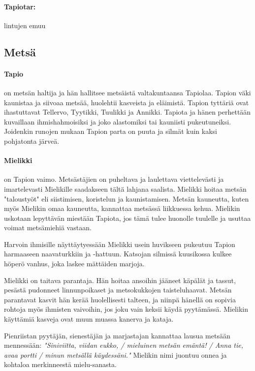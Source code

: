   \paragraph{Tapiotar:} lintujen emuu


\subsection{Metsä}

  \paragraph{Tapio} on metsän haltija ja hän hallitsee metsäistä valtakuntaansa Tapiolaa. Tapion
    väki kaunistaa ja siivoaa metsää, huolehtii kasveista ja eläimistä. Tapion tyttäriä ovat
    ihastuttavat Tellervo, Tyytikki, Tuulikki ja Annikki. Tapiota ja hänen perhettään kuvaillaan
    ihmishahmoisiksi ja joko alastomiksi tai kauniisti pukeutuneiksi. Joidenkin runojen mukaan
    Tapion parta on puuta ja silmät kuin kaksi pohjatonta järveä.
  \paragraph{Mielikki} on Tapion vaimo. Metsästäjien on puheltava ja laulettava viettelevästi ja
    imartelevasti Mielikille saadakseen tältä lahjana saalista. Mielikki hoitaa metsän "taloustyöt"
    eli siistimisen, koristelun ja kaunistamisen. Metsän kauneutta, kuten myös Mielikin omaa
    kauneutta, kannattaa metsässä liikkuessa kehua. Mielikin uskotaan lepyttävän miestään Tapiota,
    jos tämä tulee huonolle tuulelle ja usuttaa voimat metsämiehiä vastaan. \par
    Harvoin ihmisille näyttäytyessään Mielikki usein huvikseen pukeutuu Tapion harmaaseen
    naavaturkkiin ja -hattuun. Katsojan silmissä kuu\-sikossa kulkee höperö vanhus, joka laskee
    mättäiden marjoja. \par
    Mielikki on taitava parantaja. Hän hoitaa ansoihin jääneet käpälät ja tassut, pesästä pudonneet
    linnunpoikaset ja metsokukkojen taisteluhaavat. Metsän parantavat kasvit hän kerää
    huolellisesti talteen, ja niinpä hänellä on sopivia rohtoja myös ihmisten vaivoihin, jos joku
    vain keksii käydä pyytämässä. Mielikin käyttämiä kasveja ovat muun muassa kanerva ja kataja. \par
    Pienriistan pyytäjän, sienestäjän ja marjastajan kannattaa lausua metsään mennessään:
    \emph{"Siniviitta, viidan eukko, / mieluinen metsän e\-mäntä! / Anna tie, avaa portti / minun
    metsällä käydessäni."} Mielikin nimi juontuu onnea ja kohtaloa merkinneestä mielu-sanasta.
